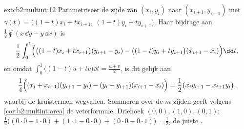 \begin{solution}{exo:b2:multint:12}
Parametriseer de zijde van $(x_i, y_i)$ naar $(x_{i+1}, y_{i+1})$
met $\gamma(t) = \bigl((1-t)x_i + tx_{i+1},\ (1-t)y_i +
ty_{i+1}\bigr)$. Haar bijdrage aan $\frac12\oint(x\,\dd y - y\,\dd
x)$ is
\[
\frac12\int_0^1\Bigl(\bigl((1-t)x_i +
tx_{i+1}\bigr)(y_{i+1} - y_i) - \bigl((1-t)y_i +
ty_{i+1}\bigr)(x_{i+1} - x_i)\Bigr)\dd t ,
\]
en omdat $\int_0^1\bigl((1-t)u + tv\bigr)\dd t = \frac{u + v}2$, is
dit gelijk aan
\[
\frac14\Bigl((x_i + x_{i+1})(y_{i+1} - y_i) - (y_i +
y_{i+1})(x_{i+1} - x_i)\Bigr)
= \frac12\bigl(x_iy_{i+1} - x_{i+1}y_i\bigr),
\]
waarbij de kruistermen wegvallen. Sommeren over de $m$ zijden geeft
volgens \cref{cor:b2:multint:area} de veterformule. Driehoek
$(0,0), (1,0), (0,1)$: $\frac12\bigl((0\cdot0 - 1\cdot0) +
(1\cdot1 - 0\cdot0) + (0\cdot0 - 0\cdot1)\bigr) = \frac12$, de
juiste .
\end{solution}

